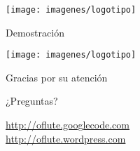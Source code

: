 {
  \begin{frame}
    \frametitle{}
    
    \begin{center}

      \texttt{[image: imagenes/logotipo]}
      
      \bigskip
      \bigskip

      {\Large Demostración}

    \end{center}

  \end{frame}

  \begin{frame}{}
    
    \begin{center}
      \texttt{[image: imagenes/logotipo]}

      \bigskip
      \bigskip

      {\LARGE Gracias por su atención}\\

      \medskip

      {\large ¿Preguntas?}\\

      \bigskip
      \medskip

      {\large \url{http://oflute.googlecode.com} \\[0.3em] \url{http://oflute.wordpress.com}}
    \end{center}

  \end{frame}
}


